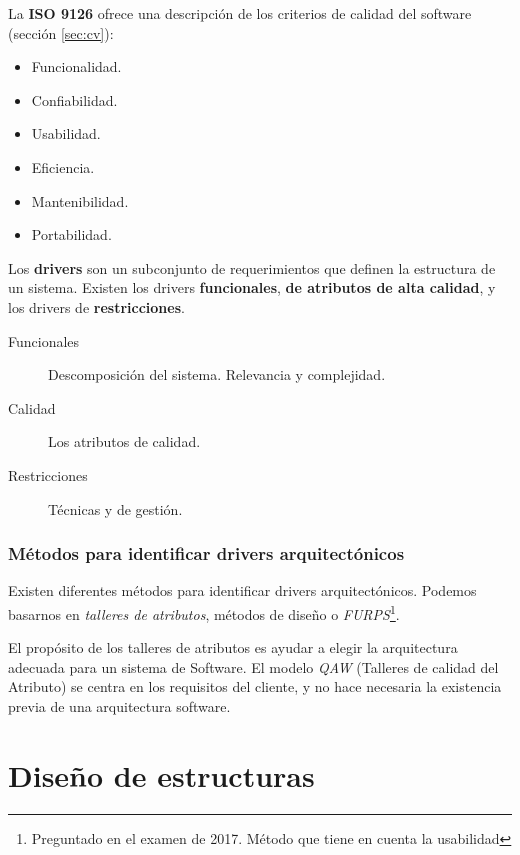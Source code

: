 La \textbf{ISO 9126} ofrece una descripción de los criterios de
calidad del software (sección \ref{sec:cv}):

\begin{itemize}[noitemsep]
\item Funcionalidad.
\item Confiabilidad.
\item Usabilidad.
\item Eficiencia.
\item Mantenibilidad.
\item Portabilidad.
\end{itemize}

Los \textbf{drivers} son un subconjunto de requerimientos que definen
la estructura de un sistema. Existen los drivers \textbf{funcionales},
\textbf{de atributos de alta calidad}, y los drivers de
\textbf{restricciones}.

\begin{description}
\item[Funcionales] Descomposición del sistema. Relevancia y
  complejidad.
\item[Calidad] Los atributos de calidad.
\item[Restricciones] Técnicas y de gestión.
\end{description}
\label{sec:drivers}

\subsubsection{Métodos para identificar drivers arquitectónicos}
\label{sec:drivers}

Existen diferentes métodos para identificar drivers
arquitectónicos. Podemos basarnos en \emph{talleres de atributos},
métodos de diseño o \emph{FURPS}\footnote{Preguntado en el examen de 2017. Método que
  tiene en cuenta la usabilidad}.

El propósito de los talleres de atributos es ayudar a elegir la
arquitectura adecuada para un sistema de Software. El modelo
\emph{QAW} (Talleres de calidad del Atributo) se centra en los
requisitos del cliente, y no hace necesaria la existencia previa de
una arquitectura software.

\section{Diseño de estructuras}
\label{sec:arquitectura:diseñoestructura}


